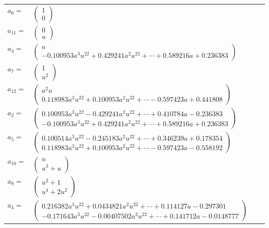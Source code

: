 \documentclass[1p]{elsarticle_modified}
\theoremstyle{definition}
\begin{document}
\begin{tabular}{m{7pt} m{180pt} m{7pt} m{180pt} }
\flushright $a_{6}=$&$\begin{pmatrix}1\\0\end{pmatrix}$ \\
\flushright $a_{11}=$&$\begin{pmatrix}0\\u\end{pmatrix}$ \\
\flushright $a_{3}=$&$\begin{pmatrix}a\\-0.100953 a^{3} u^{22}+0.429241 a^{2} u^{22}+\cdots+0.589216 a+0.236383\end{pmatrix}$ \\
\flushright $a_{7}=$&$\begin{pmatrix}1\\u^2\end{pmatrix}$ \\
\flushright $a_{12}=$&$\begin{pmatrix}a^2 u\\0.118983 a^{3} u^{22}+0.100953 a^{2} u^{22}+\cdots-0.597423 a+0.441808\end{pmatrix}$ \\
\flushright $a_{2}=$&$\begin{pmatrix}0.100953 a^{3} u^{22}-0.429241 a^{2} u^{22}+\cdots+0.410784 a-0.236383\\-0.100953 a^{3} u^{22}+0.429241 a^{2} u^{22}+\cdots+0.589216 a+0.236383\end{pmatrix}$ \\
\flushright $a_{5}=$&$\begin{pmatrix}0.100514 a^{3} u^{22}-0.245183 a^{2} u^{22}+\cdots+0.346239 a+0.178354\\0.118983 a^{3} u^{22}+0.100953 a^{2} u^{22}+\cdots-0.597423 a-0.558192\end{pmatrix}$ \\
\flushright $a_{10}=$&$\begin{pmatrix}u\\u^3+u\end{pmatrix}$ \\
\flushright $a_{8}=$&$\begin{pmatrix}u^2+1\\u^4+2 u^2\end{pmatrix}$ \\
\flushright $a_{4}=$&$\begin{pmatrix}0.216382 a^{3} u^{22}+0.0434821 a^{2} u^{22}+\cdots+0.114127 a-0.297301\\-0.171643 a^{3} u^{22}-0.00407502 a^{2} u^{22}+\cdots+0.141712 a-0.0148777\end{pmatrix}$ \\

\end{tabular}
\end{document}
